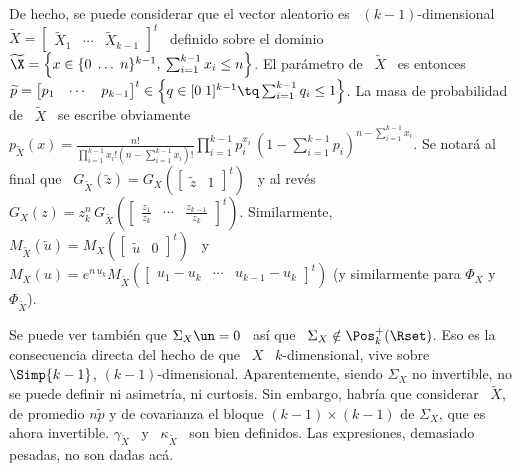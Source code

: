 De hecho, se puede considerar que el vector aleatorio es \ $(k-1)$-dimensional \
$\widetilde{X}     =    \begin{bmatrix}     \widetilde{X}_1    &     \cdots    &
  \widetilde{X}_{k-1}   \end{bmatrix}^t$   \  definido   sobre   el  dominio   \
$\widetilde{\X} = \left\{ x \in \{ 0 \; \ldots \; n\}^{k-1}, \: \sum_{i=1}^{k-1}
  x_i  \le n  \right\}$. El  par\'ametro de  \ $\widetilde{X}$  \ es  entonces \
$\widetilde{p}     =     \protect\begin{bmatrix}      p_1     &     \cdots     &
  p_{k-1}  \end{bmatrix}^t\protect  \in  \left\{   q  \in  [0  \;  1]^{k-1}  \tq
  \sum_{i=1}^{k-1}  q_i  \le  1  \right\}$.    La  masa  de  probabilidad  de  \
$\widetilde{X}$   \   se    escribe   obviamente   \   $p_{\widetilde{X}}(x)   =
\frac{n!}{\prod_{i=1}^{k-1} x_i!   (n-\sum_{i=1}^{k-1} x_i)!}  \prod_{i=1}^{k-1}
p_i^{x_i} \, \left( 1  - \sum_{i=1}^{k-1} p_i \right)^{n-\sum_{i=1}^{k-1} x_i}$.
Se  notar\'a al  final que  \ $G_{\widetilde{X}}\left(  \widetilde{z}  \right) =
G_X\left(  \begin{bmatrix} \widetilde{z}  & 1  \end{bmatrix}^t \right)$  \  y al
rev\'es   \   $G_X(z)  =   z_k^n   \,  G_{\widetilde{X}}\left(   \begin{bmatrix}
    \frac{z_1}{z_k}  & \cdots  &  \frac{z_{k-1}}{z_k} \end{bmatrix}^t  \right)$.
Similarmente,    \     $M_{\widetilde{X}}\left(    \widetilde{u}    \right)    =
M_X\left(  \begin{bmatrix} \widetilde{u}  &  0 \end{bmatrix}^t  \right)$  \ y  \
$M_X(u)  = e^{n  \, u_k}  M_{\widetilde{X}}\left(  \begin{bmatrix} u_1  - u_k  &
    \cdots  &  u_{k-1}  -  u_k  \end{bmatrix}^t \right)$  (y  similarmente  para
$\Phi_X$ y $\Phi_{\widetilde{X}}$).

Se puede ver  tambi\'en que $\Sigma_X \un  = 0$ \ as\'i que  \ $\Sigma_X \notin
\Pos_k^+(\Rset)$.   Eso  es la  consecuencia  directa  del hecho  de  que  \ $X$  \
$k$-dimensional, vive sobre  \ $\Simp{k-1}$, $(k-1)$-dimensional. Aparentemente,
siendo  $\Sigma_X$  no  invertible,  no  se  puede  definir  ni  asimetr\'ia,  ni
curtosis. Sin embargo, habr\'ia que considerar \ $\widetilde{X}$, de promedio $n
\widetilde{p}$ y de covarianza el bloque $(k-1) \times (k-1)$ de $\Sigma_X$, que es
ahora invertible. $\gamma_{\widetilde{X}}$ \  y \ $\kappa_{\widetilde{X}}$ \ son
bien definidos. Las expresiones, demasiado pesadas, no son dadas ac\'a.

